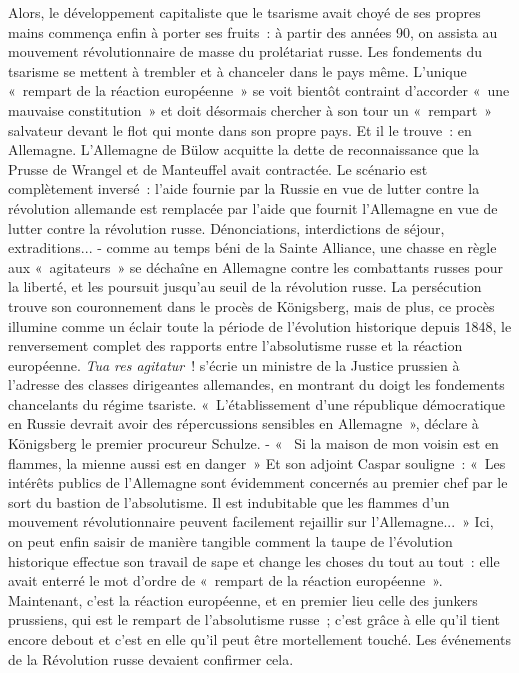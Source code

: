 \documentclass[french,twoside]{book} %
\begin{document}
Alors, le développement capitaliste que le tsarisme avait choyé de ses propres mains commença enfin à porter ses fruits : à partir des années 90, on assista au mouvement révolutionnaire de masse du prolétariat russe. Les fondements du tsarisme se mettent à trembler et à chanceler dans le pays même. L'unique « rempart de la réaction européenne » se voit bientôt contraint d’accorder « une mauvaise constitution » et doit désormais chercher à son tour un « rempart » salvateur devant le flot qui monte dans son propre pays. Et il le trouve : en Allemagne. L'Allemagne de Bülow acquitte la dette de reconnaissance que la Prusse de Wrangel et de Manteuffel avait contractée. Le scénario est complètement inversé : l’aide fournie par la Russie en vue de lutter contre la révolution allemande est remplacée par l’aide que fournit l’Allemagne en vue de lutter contre la révolution russe. Dénonciations, interdictions de séjour, extraditions... - comme au temps béni de la Sainte Alliance, une chasse en règle aux « agitateurs » se déchaîne en Allemagne contre les combattants russes pour la liberté, et les poursuit jusqu’au seuil de la révolution russe. La persécution trouve son couronnement dans le procès de Königsberg, mais de plus, ce procès illumine comme un éclair toute la période de l’évolution historique depuis 1848, le renversement complet des rapports entre l’absolutisme russe et la réaction européenne. \emph{Tua res agitatur} ! s’écrie un ministre de la Justice prussien à l’adresse des classes dirigeantes allemandes, en montrant du doigt les fondements chancelants du régime tsariste. « L'établissement d’une république démocratique en Russie devrait avoir des répercussions sensibles en Allemagne », déclare à Königsberg le premier procureur Schulze. - «  Si la maison de mon voisin est en flammes, la mienne aussi est en danger » Et son adjoint Caspar souligne : « Les intérêts publics de l’Allemagne sont évidemment concernés au premier chef par le sort du bastion de l’absolutisme. Il est indubitable que les flammes d’un mouvement révolutionnaire peuvent facilement rejaillir sur l’Allemagne... » Ici, on peut enfin saisir de manière tangible comment la taupe de l’évolution historique effectue son travail de sape et change les choses du tout au tout : elle avait enterré le mot d’ordre de « rempart de la réaction européenne ». Maintenant, c’est la réaction européenne, et en premier lieu celle des junkers prussiens, qui est le rempart de l’absolutisme russe ; c’est grâce à elle qu’il tient encore debout et c’est en elle qu’il peut être mortellement touché. Les événements de la Révolution russe devaient confirmer cela.\par
\end{document}

